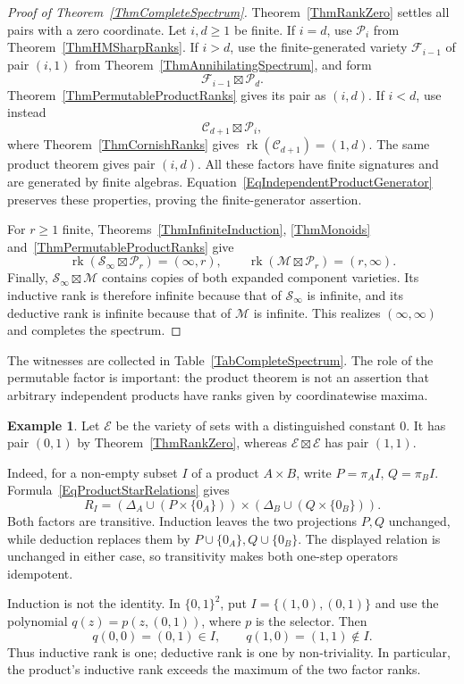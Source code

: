 \documentclass[12pt,english]{amsart}
\theoremstyle{definition}
\newtheorem{example}[theorem]{Example}
\numberwithin{equation}{section}
\theoremstyle{remark}
\begin{document}
\begin{proof}[Proof of Theorem~\ref{ThmCompleteSpectrum}]
Theorem~\ref{ThmRankZero} settles all pairs with a zero coordinate.
Let $i,d\geqslant1$ be finite. If $i=d$, use $\mathcal P_i$ from
Theorem~\ref{ThmHMSharpRanks}. If $i>d$, use the finite-generated
variety $\mathcal F_{i-1}$ of pair $(i,1)$ from
Theorem~\ref{ThmAnnihilatingSpectrum}, and form
\[
\mathcal F_{i-1}\boxtimes\mathcal P_d.
\]
Theorem~\ref{ThmPermutableProductRanks} gives its pair as $(i,d)$.
If $i<d$, use instead
\[
\mathcal C_{d+1}\boxtimes\mathcal P_i,
\]
where Theorem~\ref{ThmCornishRanks} gives
$\operatorname{rk}(\mathcal C_{d+1})=(1,d)$.
The same product theorem gives pair $(i,d)$.
All these factors have finite signatures and are generated by finite
algebras. Equation~\eqref{EqIndependentProductGenerator} preserves
these properties, proving the finite-generator assertion.

For $r\geqslant1$ finite, Theorems~\ref{ThmInfiniteInduction},
\ref{ThmMonoids} and~\ref{ThmPermutableProductRanks} give
\[
\operatorname{rk}(\mathcal S_\infty\boxtimes\mathcal P_r)=(\infty,r),
\qquad
\operatorname{rk}(\mathcal M\boxtimes\mathcal P_r)=(r,\infty).
\]
Finally, $\mathcal S_\infty\boxtimes\mathcal M$ contains copies of
both expanded component varieties. Its inductive rank is therefore
infinite because that of $\mathcal S_\infty$ is infinite, and its
deductive rank is infinite because that of $\mathcal M$ is infinite.
This realizes $(\infty,\infty)$ and completes the spectrum.
\end{proof}

The witnesses are collected in Table~\ref{TabCompleteSpectrum}. The
role of the permutable factor is important: the product theorem is
not an assertion that arbitrary independent products have ranks
given by coordinatewise maxima.

\begin{example}\label{ExProductNotMaxima}
Let $\mathcal E$ be the variety of sets with a distinguished constant $0$.
It has pair $(0,1)$ by Theorem~\ref{ThmRankZero}, whereas
$\mathcal E\boxtimes\mathcal E$ has pair $(1,1)$.

Indeed, for a non-empty subset $I$ of a product $A\times B$, write
$P=\pi_A I$, $Q=\pi_B I$.
Formula~\eqref{EqProductStarRelations} gives
\[
R_I=(\Delta_A\cup(P\times\{0_A\}))
       \times(\Delta_B\cup(Q\times\{0_B\})).
\]
Both factors are transitive. Induction leaves the two projections
$P,Q$ unchanged, while deduction replaces them by
$P\cup\{0_A\},Q\cup\{0_B\}$. The displayed relation is unchanged
in either case, so transitivity makes both one-step operators
idempotent.

Induction is not the identity. In $\{0,1\}^2$, put
$I=\{(1,0),(0,1)\}$ and use the polynomial
$q(z)=p(z,(0,1))$, where $p$ is the selector. Then
\[
q(0,0)=(0,1)\in I,\qquad
q(1,0)=(1,1)\notin I.
\]
Thus inductive rank is one; deductive rank is one by non-triviality.
In particular, the product's inductive rank exceeds the maximum of
the two factor ranks.
\end{example}
\end{document}
